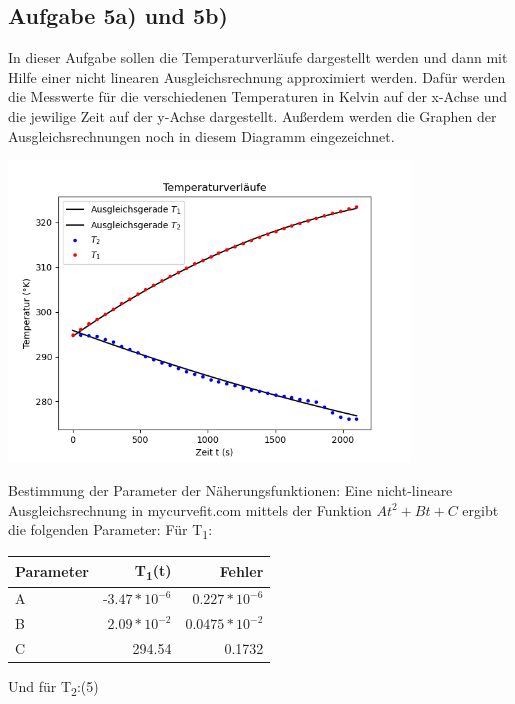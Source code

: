 \documentclass[titlepage=firstcover, captions=tableheading]{scrartcl}
\begin{document}
\subsection{Aufgabe 5a) und 5b)}   

In dieser Aufgabe sollen die Temperaturverläufe dargestellt werden und dann mit Hilfe einer nicht linearen Ausgleichsrechnung approximiert werden. 
Dafür werden die Messwerte für die verschiedenen Temperaturen in Kelvin auf der x-Achse und die jewilige Zeit auf der y-Achse dargestellt. 
Außerdem werden die Graphen der Ausgleichsrechnungen noch in diesem Diagramm eingezeichnet.

\begin{center}
    \includegraphics[height=8cm]{plot2.png}
\end{center}
Bestimmung der Parameter der Näherungsfunktionen: 
Eine nicht-lineare Ausgleichsrechnung in mycurvefit.com mittels der Funktion $At^2+Bt+C$ ergibt die folgenden Parameter: 
Für T\textsubscript{1}:

\begin{center}
    
\begin{tabular}{
    l
    r
    @{${}\pm{}$}
    r
}
    \toprule
    {Parameter} & {T\textsubscript{1}(t)} & {Fehler} \\
    \midrule
    A & -$3.47 * 10^{-6}$ &  $0.227 *10^{-6}$ \\
    B & $2.09 * 10^{-2} $&  $0.0475 * 10^{-2} $ \\
    C & 294.54 &  0.1732 \\
    \bottomrule
\end{tabular}
\end{center}

Und für T\textsubscript{2}:(5)
\end{document}
